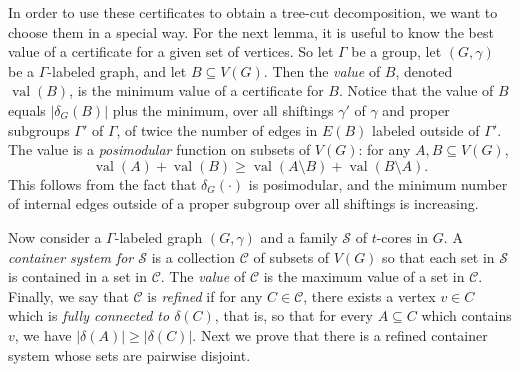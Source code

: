 \documentclass[11pt]{article}
\theoremstyle{definition}
\DeclareMathOperator{\val}{val}
\begin{document}
In order to use these certificates to obtain a tree-cut decomposition, we want to choose them in a special way. For the next lemma, it is useful to know the best value of a certificate for a given set of vertices. So let $\Gamma$ be a group, let $(G, \gamma)$ be a $\Gamma$-labeled graph, and let $B \subseteq V(G)$. Then the \textit{value} of $B$, denoted $\val(B)$, is the minimum value of a certificate for $B$. Notice that the value of $B$ equals $|\delta_G(B)|$ plus the minimum, over all shiftings $\gamma'$ of $\gamma$ and proper subgroups $\Gamma'$ of $\Gamma$, of twice the number of edges in $E(B)$ labeled outside of $\Gamma'$. The value is a \emph{posimodular} function on subsets of $V(G)$: for any $A,B \subseteq V(G)$,
$$\val(A) + \val(B) \geq \val(A \setminus B) + \val(B \setminus A).$$
This follows from the fact that $\delta_G(\cdot)$ is posimodular, and the minimum number of internal edges outside of a proper subgroup over all shiftings is increasing.

Now consider a $\Gamma$-labeled graph $(G, \gamma)$ and a family $\mathcal{S}$ of $t$-cores in $G$. A \emph{container system for $\mathcal{S}$} is a collection $\mathcal{C}$ of subsets of $V(G)$ so that each set in $\mathcal{S}$ is contained in a set in $\mathcal{C}$. The \emph{value} of $\mathcal{C}$ is the maximum value of a set in $\mathcal{C}$. Finally, we say that $\mathcal{C}$ is \emph{refined} if for any $C\in \mathcal{C}$, there exists a vertex $v \in C$ which is \emph{fully connected to $\delta(C)$}, that is, so that for every $A \subseteq C$ which contains $v$, we have $|\delta(A)|\geq |\delta(C)|$. Next we prove that there is a refined container system whose sets are pairwise disjoint.
\end{document}

